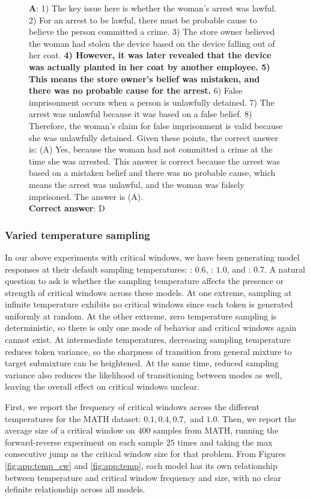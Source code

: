 \begin{figure}[H]
\begin{tcolorbox}[colback=blue!5!white,colframe=blue!75!black,title=MMLU example (\qweninstruct)]
\textbf{A}: 1) The key issue here is whether the woman's arrest was lawful. 2) For an arrest to be lawful, there must be probable cause to believe the person committed a crime. 3) The store owner believed the woman had stolen the device based on the device falling out of her coat. \textbf{4) However, it was later revealed that the device was actually planted in her coat by another employee. 5) This means the store owner's belief was mistaken, and there was no probable cause for the arrest.} 6) False imprisonment occurs when a person is unlawfully detained. 7) The arrest was unlawful because it was based on a false belief. 8) Therefore, the woman's claim for false imprisonment is valid because she was unlawfully detained. Given these points, the correct answer is: (A) Yes, because the woman had not committed a crime at the time she was arrested. This answer is correct because the arrest was based on a mistaken belief and there was no probable cause, which means the arrest was unlawful, and the woman was falsely imprisoned. The answer is (A).\\

\textbf{Correct answer}: D
\end{tcolorbox}
\end{figure}


\subsubsection{Varied temperature sampling}\label{app:temp_samp_cot}

In our above experiments with critical windows, we have been generating model responses at their default sampling temperatures: \llamainstruct: $0.6$, \phiinstruct: $1.0$, and \qweninstruct: $0.7$. A natural question to ask is whether the sampling temperature affects the presence or strength of critical windows across these models. At one extreme, sampling at infinite temperature exhibits no critical windows since each token is generated uniformly at random. At the other extreme, zero temperature sampling is deterministic, so there is only one mode of behavior and critical windows again cannot exist. At intermediate temperatures, decreasing sampling temperature reduces token variance, so the sharpness of transition from general mixture to target submixture can be heightened. At the same time, reduced sampling variance also reduces the likelihood of transitioning between modes as well, leaving the overall effect on critical windows unclear. 


First, we report the frequency of critical windows across the different temperatures for the MATH dataset: $0.1, 0.4, 0.7, $ and $1.0$. Then, we report the average size of a critical window on $400$ samples from MATH, running the forward-reverse experiment on each sample $25$ times and taking the max consecutive jump as the critical window size for that problem. From Figures \ref{fig:app:temp_cw} and \ref{fig:app:temp}, each model has its own relationship between temperature and critical window frequency and size, with no clear definite relationship across all models.

